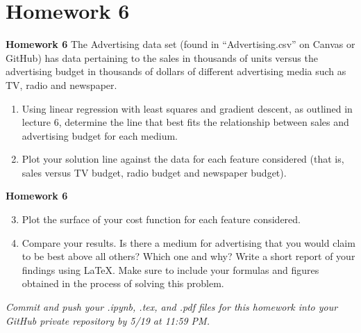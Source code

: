 \documentclass[xcolor=dvipsnames]{beamer}
\begin{document}
\section{Homework 6}
\begin{frame}
{\bf Homework 6}
The Advertising data set (found in ``Advertising.csv'' on Canvas or GitHub) has data pertaining to the sales in thousands of units versus the advertising budget in thousands of dollars of different advertising media such as TV, radio and newspaper.\\ \pause
\begin{enumerate}
\item Using linear regression with least squares and gradient descent, as outlined in lecture 6,  determine the line that best fits the relationship between sales and advertising budget for each medium. \pause
\item Plot your solution line against the data for each feature considered (that is, sales versus TV budget, radio budget and newspaper budget).
\end{enumerate}
\end{frame}

\begin{frame}
{\bf Homework 6}

\begin{enumerate}
\setcounter{enumi}{2}
\item Plot the surface of your cost function for each feature considered.\pause
\item Compare your results. Is there a medium for advertising that you would claim to be best above all others? Which one and why? Write a short report of your findings using \LaTeX. Make sure to include your formulas and figures obtained in the process of solving this problem.\pause
\end{enumerate}

{\it Commit and push your .ipynb, .tex, and .pdf files for this homework into your GitHub private repository by 5/19 at 11:59 PM.}
\end{frame}
\end{document}
